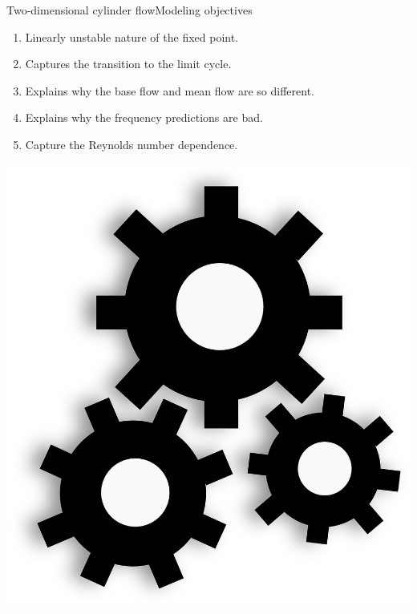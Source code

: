 \documentclass[usenames,dvipsnames,svgnames,10pt,aspectratio=169]{beamer}
\begin{document}
\begin{frame}[t, c]{Two-dimensional cylinder flow}{Modeling objectives}
  \begin{minipage}{.68\textwidth}
    \centering
    
    \bigskip

    \begin{enumerate}
    \item Linearly unstable nature of the fixed point.
    \item Captures the transition to the limit cycle.
    \item Explains why the base flow and mean flow are so different.
    \item Explains why the frequency predictions are bad.
    \item Capture the Reynolds number dependence.
    \end{enumerate}

  \end{minipage}%
  \hfill
  \begin{minipage}{.28\textwidth}
    \centering
    \includegraphics[width=\textwidth]{Gears}
  \end{minipage}

  \vspace{1cm}
\end{frame}
\end{document}
